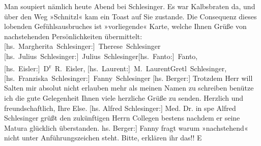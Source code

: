 \begin{ledgroupsized}[t]{13cm}
           \pstart
           Man soupiert nämlich heute Abend bei Schlesinger. Es war Kalbsbraten da, und über den Weg »Schnitzl« kam ein
               Toast auf Sie zustande. Die Consequenz dieses lobenden Gefühlsausbruches ist
               »vorliegende« Karte, welche Ihnen Grüße von nachstehenden Persönlichkeiten
               übermittelt:\pend
           \pstart \spacefill\mbox{{[}hs. Margherita Schlesinger:{]} Therese Schlesinger}{ }\spacefill\mbox{{[}hs. Julius Schlesinger:{]} Julius Schlesinger}\spacefill\mbox{{[}hs. Fanto:{]} Fanto}, \spacefill\mbox{{[}hs. Eisler:{]} D\textsuperscript{r} R. Eisler}, \spacefill\mbox{{[}hs. Laurent:{]} M. Laurent}\spacefill\mbox{Gretl Schlesinger,}\spacefill\mbox{{[}hs. Franziska Schlesinger:{]} Fanny Schlesinger}\pend{}\pstart
           {[}hs. Berger:{]} Trotzdem Herr \introOben{}will\introOben{} Salten mir
               absolut nicht erlauben mehr als meinen Namen zu schreiben benütze ich die gute
               Gelegenheit Ihnen viele herzliche Grüße zu senden.\pend
           \pstart
           Herzlich und freundschaftlich, Ihre \spacefill\mbox{Else.}\pend
           \pstart
           {[}hs. Alfred Schlesinger:{]} Med. Dr. \introOben{}in spe\introOben{} Alfred
               Schlesinger grüßt den zukünftigen Herrn Collegen bestens nachdem er seine Matura
               glücklich überstanden.\pend
           \pstart
           \noindent{}{[}hs. Berger:{]} Fanny fragt warum »nachstehend« nicht unter
                  Anführungszeichen steht. Bitte, erklären  ihr
                  das!! \spacefill\mbox{E}\pend
           
         
         \endnumbering{}\end{ledgroupsized}\begin{anhang}\end{anhang}\newcommand{\dateiname}{L03177}\newcommand{\titel}{Felix Salten u. a. an Arthur Schnitzler, 6. 8. 1896}\newcommand{\editorInnen}{Martin Anton Müller und Laura Untner}
      